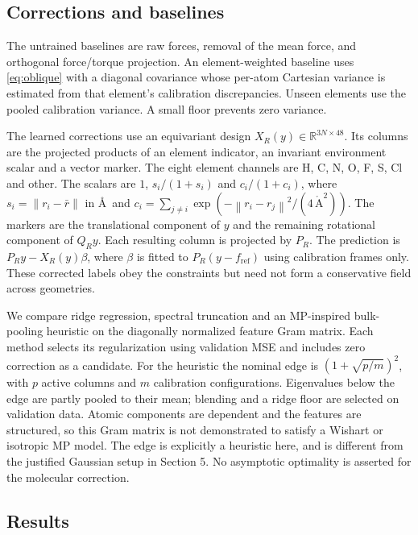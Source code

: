 \documentclass[11pt]{article}
\newcommand{\R}{\mathbb{R}}
\newcommand{\norm}[1]{\left\lVert #1\right\rVert}
\begin{document}
\subsection{Corrections and baselines}
The untrained baselines are raw forces, removal of the mean force, and orthogonal
force/torque projection. An element-weighted baseline uses \eqref{eq:oblique} with
a diagonal covariance whose per-atom Cartesian variance is estimated from that
element's calibration discrepancies. Unseen elements use the pooled calibration
variance. A small floor prevents zero variance.

The learned corrections use an equivariant design $X_R(y)\in\R^{3N\times48}$.
Its columns are the projected products of an element indicator, an invariant
environment scalar and a vector marker. The eight element channels are H, C, N,
O, F, S, Cl and other. The scalars are $1$, $s_i/(1+s_i)$ and $c_i/(1+c_i)$, where
$s_i=\norm{r_i-\bar r}$ in \AA\ and
$c_i=\sum_{j\ne i}\exp(-\norm{r_i-r_j}^2/(4\,\mathring{\mathrm A}^{2}))$.
The markers are the translational component of $y$ and the remaining rotational
component of $Q_Ry$. Each resulting column is projected by $P_R$.
The prediction is $P_Ry-X_R(y)\beta$, where $\beta$ is fitted to
$P_R(y-f_{\mathrm{ref}})$ using calibration frames only. These corrected labels
obey the constraints but need not form a conservative field across geometries.

We compare ridge regression, spectral truncation and an MP-inspired bulk-pooling
heuristic on the diagonally normalized feature Gram matrix. Each method selects
its regularization using validation MSE and includes zero correction as a candidate.
For the heuristic the nominal edge is $(1+\sqrt{p/m})^2$, with $p$ active columns
and $m$ calibration configurations. Eigenvalues below the edge are partly pooled
to their mean; blending and a ridge floor are selected on validation data.
Atomic components are dependent and the features are structured, so this Gram
matrix is not demonstrated to satisfy a Wishart or isotropic MP model. The edge
is explicitly a heuristic here, and is different from the justified Gaussian setup
in Section 5. No asymptotic optimality is asserted for the molecular correction.

\subsection{Results}
\begin{table}[t]
\centering\small

\caption{Out-of-fold force-label discrepancies in meV/\AA. The pooled metric weights
Cartesian components equally. No trained potential prediction is included in this table.}
\label{tab:real}
\end{table}
\end{document}
